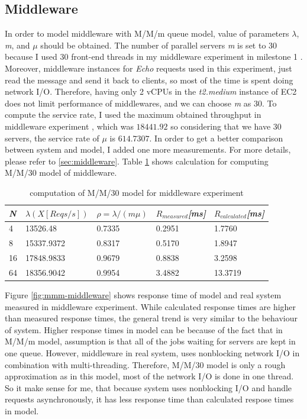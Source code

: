 \documentclass[11pt]{article}
\begin{document}
\subsection{Middleware}

In order to model middleware with M/M/m queue model, value of parameters $\lambda$, 
\emph{m}, and $\mu$ should be obtained. The number of parallel servers \emph{m} is set to 30 because I used 30 
front-end threads in my middleware experiment in milestone 1 \cite[section~1.2.4]{ms1}. 
Moreover, middleware instances for \emph{Echo} requests used in this experiment, just read the message and send it back
to clients, so most of the time is spent doing network I/O. Therefore,
having only 2 vCPUs in the \emph{t2.medium} instance of EC2 does not limit performance of middlewares,
and we can choose \emph{m} as 30. To compute the service rate, I used the maximum obtained throughput 
in middleware experiment \cite[section~1.2.4]{ms1}, which was $18441.92$ so considering 
that we have 30 servers, the service rate of $\mu$ is $614.7307$. In order to get a better comparison 
between system and model, I added one more measurements. For more details, please refer to \cref{sec:middleware}.
Table \ref{tbl:mmm-middleware} shows calculation for computing M/M/30 model of 
middleware. 

\begin{table}[!ht]
  \begin{tabular}{*5l}    \toprule
  \emph{N} & \emph{$\lambda(X[Reqs/s])$} &  \emph{$\rho=\lambda/(m \mu)$}  & \emph{$R_{measured}$[ms]} & \emph{$R_{calculated}$[ms]}\\\midrule
4  & 13526.48   & 0.7335  & 0.2951 & 1.7760 \\
8  & 15337.9372 & 0.8317  & 0.5170 & 1.8947 \\
16 & 17848.9833 & 0.9679  & 0.8838 & 3.2598 \\
64 & 18356.9042 & 0.9954  & 3.4882 & 13.3719 \\
\hline
  \end{tabular}
  \centering
  \caption{computation of M/M/30 model for middleware experiment}
  \label{tbl:mmm-middleware}
\end{table}


Figure \ref{fig:mmm-middleware} shows response time of model and real system measured in middleware experiment. 
While calculated response times are higher than measured response times, the general 
trend is very similar to the behaviour of system. Higher response times in model can be because of the fact that 
in M/M/m model, assumption is that all of the jobs waiting for servers are kept 
in one queue. However, middleware in real system, uses nonblocking network I/O in 
combination with multi-threading. Therefore, M/M/30 model is only a rough approximation
as in this model, most of the network I/O is done in one thread.
So it make sense for me, that because system uses nonblocking I/O and handle requests 
asynchronously, it has less response time than calculated respose times in model. 
\end{document}
